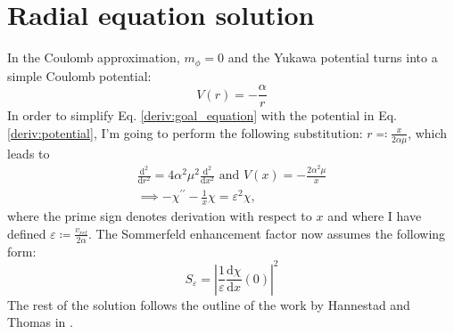 \section{Radial equation solution}
In the Coulomb approximation, \(m_{\phi }=0 \) and the Yukawa potential turns into a simple Coulomb potential:
\begin{equation}\label{deriv:potential}
	V(r)=-\frac{\alpha}{r}
\end{equation}
In order to simplify Eq. \eqref{deriv:goal_equation} with the potential in Eq. \eqref{deriv:potential}, I'm going to perform the following substitution: \(r \eqqcolon \frac{x}{2\alpha \mu } \), which leads to
\begin{gather}
	\frac{\mathrm{d}^2}{\mathrm{d}r^2} = 4 \alpha ^2 \mu ^2 \frac{\mathrm{d}^2}{\mathrm{d}x^2} \text{ and } V(x) = - \frac{2\alpha ^2\mu}{x} \\
	\implies - \chi^{\prime\prime} - \frac{1}{x} \chi = \varepsilon ^2 \chi, \label{deriv:final_equation}
\end{gather}
where the prime sign denotes derivation with respect to \(x\) and where I have defined \(\varepsilon \coloneqq \frac{v_{rel} }{2 \alpha }\). The Sommerfeld enhancement factor now assumes the following form:
\begin{equation}
	S_{\varepsilon } = \left\vert \frac{1}{\varepsilon } \frac{\mathrm{d}\chi }{\mathrm{d}x} (0) \right\vert^2
\end{equation}
The rest of the solution follows the outline of the work by Hannestad and Thomas in \cite{Hannestad_2011}.

